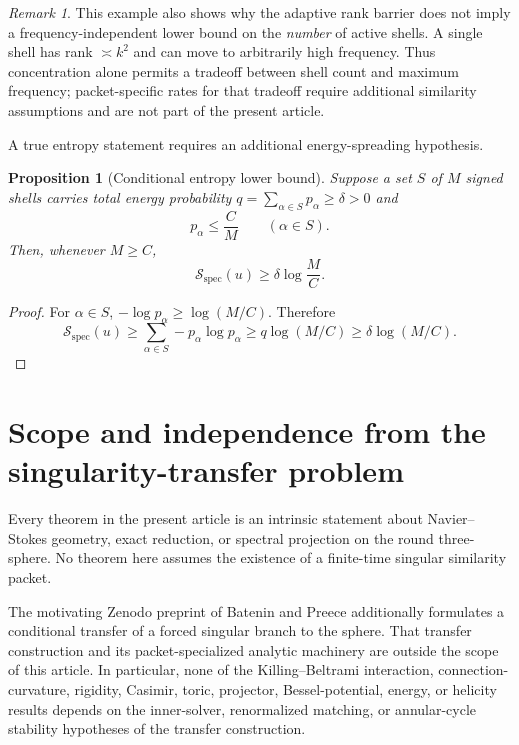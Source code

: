 \documentclass[
 aps,
 prd,
 reprint,
 amsmath,
 amssymb,
 nofootinbib,
 superscriptaddress
]{revtex4-2}
\newtheorem{proposition}[theorem]{Proposition}
\theoremstyle{definition}
\theoremstyle{remark}
\newtheorem{remark}[theorem]{Remark}
\begin{document}
\begin{remark}
This example also shows why the adaptive rank barrier does not imply a
frequency-independent lower bound on the \emph{number} of active shells.
A single shell has rank $\asymp k^2$ and can move to arbitrarily high
frequency.  Thus concentration alone permits a tradeoff between shell count
and maximum frequency; packet-specific rates for that tradeoff require additional similarity
assumptions and are not part of the present article.
\end{remark}

A true entropy statement requires an additional energy-spreading hypothesis.

\begin{proposition}[Conditional entropy lower bound]
\label{prop:conditionalentropy}
Suppose a set $S$ of $M$ signed shells carries total energy probability
$q=\sum_{\alpha\in S}p_\alpha\ge\delta>0$ and
\[
 p_\alpha\le\frac{C}{M}
 \qquad(\alpha\in S).
\]
Then, whenever $M\ge C$,
\begin{equation}
 \boxed{
 \mathcal S_{\mathrm{spec}}(u)
 \ge
 \delta\log\frac{M}{C}.
 }
 \label{eq:conditionalentropy}
\end{equation}
\end{proposition}

\begin{proof}
For $\alpha\in S$,
$-\log p_\alpha\ge\log(M/C)$.  Therefore
\[
 \mathcal S_{\mathrm{spec}}(u)
 \ge
 \sum_{\alpha\in S}-p_\alpha\log p_\alpha
 \ge
 q\log(M/C)
 \ge
 \delta\log(M/C).
\]
\end{proof}



\section{Scope and independence from the singularity-transfer problem}
\label{sec:scope}

Every theorem in the present article is an intrinsic statement about
Navier--Stokes geometry, exact reduction, or spectral projection on the round
three-sphere.  No theorem here assumes the existence of a finite-time
singular similarity packet.

The motivating Zenodo preprint of Batenin and Preece
\cite{PreeceBatenin2026} additionally formulates a conditional transfer of a
forced singular branch to the sphere.  That transfer construction and its
packet-specialized analytic machinery are outside the scope of this article.
In particular, none of the Killing--Beltrami interaction,
connection-curvature, rigidity, Casimir, toric, projector,
Bessel-potential, energy, or helicity results depends on the inner-solver,
renormalized matching, or annular-cycle stability hypotheses of the transfer
construction.
\end{document}
